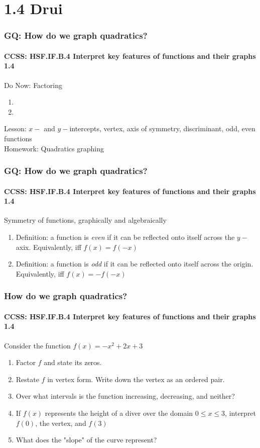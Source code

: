 \documentclass{beamer}
\begin{document}
  \section{1.4 Drui}
  \frame
  {
    \frametitle{GQ: How do we graph quadratics?}
    \framesubtitle{CCSS: HSF.IF.B.4 Interpret key features of functions and their graphs \qquad \alert{1.4}}

    \begin{block}{Do Now: Factoring}
    \begin{enumerate}
        \item
        \item
    \end{enumerate}
    \end{block}
    Lesson: $x-$ and $y-$intercepts, vertex, axis of symmetry, discriminant, odd, even functions
    \\%
    Homework: Quadratics graphing
  }

  \frame
  {
    \frametitle{GQ: How do we graph quadratics?}
    \framesubtitle{CCSS: HSF.IF.B.4 Interpret key features of functions and their graphs \qquad \alert{1.4}}

    \begin{block}{Symmetry of functions, graphically and algebraically}
    \begin{enumerate}
        \item Definition: a function is \emph{even} if it can be reflected onto itself across the $y-$axix. Equivalently, iff $f(x)=f(-x)$
        \item Definition: a function is \emph{odd} if it can be reflected onto itself across the origin. Equivalently, iff $f(x)=-f(-x)$
    \end{enumerate}
    \end{block}
  }

  \frame
  {
    \frametitle{How do we graph quadratics?}
    \framesubtitle{CCSS: HSF.IF.B.4 Interpret key features of functions and their graphs \qquad \alert{1.4}}

    \begin{block}{Consider the function $f(x)=-x^2+2x+3$}
    \begin{enumerate}
        \item Factor $f$ and state its zeros.
        \item Restate $f$ in vertex form. Write down the vertex as an ordered pair.
        \item Over what intervals is the function increasing, decreasing, and neither?
        \item If $f(x)$ represents the height of a diver over the domain $0 \leq x \leq 3$, interpret $f(0)$, the vertex, and $f(3)$
        \item What does the "slope" of the curve represent?
    \end{enumerate}
    \end{block}
  }
\end{document}
